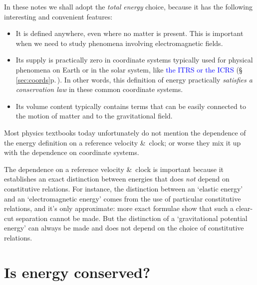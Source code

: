 \documentclass[a4paper,12pt,%
onecolumn,oneside,%
british%
]{memoir}
\newcommand*{\amp}{\&}
\renewcommand*{\|}[1][]{\nonscript\:#1\vert\nonscript\:\mathopen{}}
\newcommand*{\sect}{\S}%
\renewcommand*{\autoref}[3][\sect\,\ref]{\textcolor{blue}{#3} {\color{blue}\scriptsize(\faIcon[regular]{eye}\;#1{#2}\;p.\,\pageref{#2})}}
\newcommand*{\yE}{E}
\newcommand*{\yH}{\varPhi}%
\begin{document}
In these notes we shall adopt the \emph{total energy} choice, because it has the following interesting and convenient features:
\begin{itemize}
\item It is defined anywhere, even where no matter is present. This is important when we need to study phenomena involving electromagnetic fields.

\item\label{item:energy_no_supply} Its supply is practically zero in coordinate systems typically used for physical phenomena on Earth or in the solar system, like \autoref{sec:coords}{the ITRS or the ICRS}. In other words, this definition of energy practically \emph{satisfies a conservation law} in these common coordinate systems.

\item Its volume content %
  typically contains terms that can be easily connected to the motion of matter and to the gravitational field.
\end{itemize}




\begin{warning}
  Most physics textbooks today unfortunately do not mention the dependence of the energy definition on a reference velocity \amp\ clock; or worse they mix it up with the dependence on coordinate systems.

  \smallskip

  The dependence on a reference velocity \amp\ clock is important because it establishes an exact distinction between energies that does \emph{not} depend on constitutive relations. For instance, the distinction between an \enquote*{elastic energy} and an \enquote*{electromagnetic energy} comes from the use of particular constitutive relations, and it's only approximate: more exact formulae show that such a clear-cut separation cannot be made. But the distinction of a \enquote*{gravitational potential energy} can always be made and does not depend on the choice of constitutive relations.
\end{warning}

\section{Is energy conserved?}
\label{sec:energy_conserved}
\end{document}
